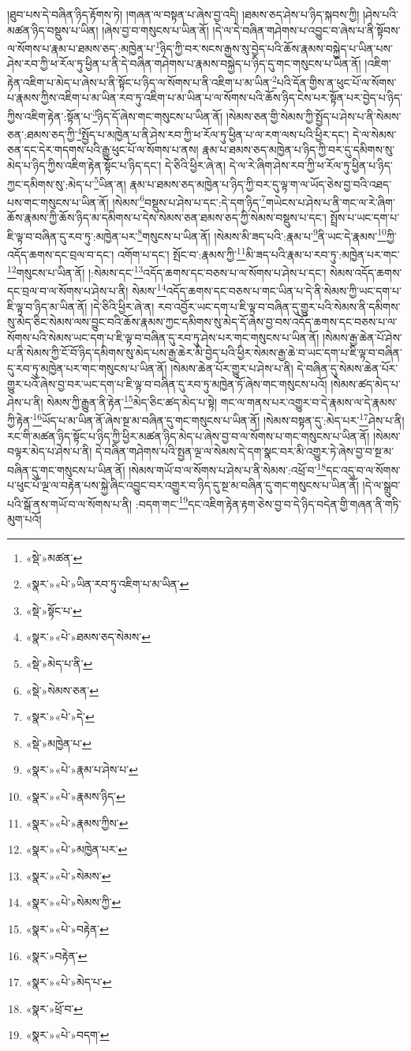 །ཐུབ་པས་དེ་བཞིན་ཉིད་རྟོགས་ཏེ། །གཞན་ལ་བསྟན་པ་ཞེས་བྱ་འདི། །ཐམས་ཅད་ཤེས་པ་ཉིད་སྐབས་ཀྱི། །ཤེས་པའི་མཚན་ཉིད་བསྡུས་པ་ཡིན། །ཞེས་བྱ་བ་གསུངས་པ་ཡིན་ནོ། །དེ་ལ་དེ་བཞིན་གཤེགས་པ་འབྱུང་བ་ཞེས་པ་ནི་སྟོབས་ལ་སོགས་པ་རྣམ་པ་ཐམས་ཅད་:མཁྱེན་པ་\footnote{«སྡེ་»མཚན་}ཉིད་ཀྱི་བར་སངས་རྒྱས་སུ་བྱེད་པའི་ཆོས་རྣམས་བསྐྱེད་པ་ཡིན་པས་ཤེས་རབ་ཀྱི་ཕ་རོལ་ཏུ་ཕྱིན་པ་ནི་དེ་བཞིན་གཤེགས་པ་རྣམས་བསྐྱེད་པ་ཉིད་དུ་གང་གསུངས་པ་ཡིན་ནོ། །འཇིག་རྟེན་འཇིག་པ་མེད་པ་ཞེས་པ་ནི་སྟོང་པ་ཉིད་ལ་སོགས་པ་ནི་འཇིག་པ་མ་ཡིན་\footnote{«སྣར་»«པེ་»ཡིན་རབ་ཏུ་འཇིག་པ་མ་ཡིན་}པའི་དོན་གྱིས་ན་ཕུང་པོ་ལ་སོགས་པ་རྣམས་ཀྱིས་འཇིག་པ་མ་ཡིན་རབ་ཏུ་འཇིག་པ་མ་ཡིན་པ་ལ་སོགས་པའི་ཆོས་ཉིད་ངེས་པར་སྟོན་པར་བྱེད་པ་ཉིད་ཀྱིས་འཇིག་རྟེན་:སྟོན་པ་\footnote{«སྡེ་»སྟོང་པ་}ཉིད་དོ་ཞེས་གང་གསུངས་པ་ཡིན་ནོ། །སེམས་ཅན་གྱི་སེམས་ཀྱི་སྤྱོད་པ་ཤེས་པ་ནི་སེམས་ཅན་:ཐམས་ཅད་ཀྱི་\footnote{«སྣར་»«པེ་»ཐམས་ཅད་སེམས་}སྤྱོད་པ་མཁྱེན་པ་ནི་ཤེས་རབ་ཀྱི་ཕ་རོལ་ཏུ་ཕྱིན་པ་ལ་རག་ལས་པའི་ཕྱིར་དང་། དེ་ལ་སེམས་ཅན་དང་དེར་གདགས་པའི་རྒྱུ་ཕུང་པོ་ལ་སོགས་པ་ནས། རྣམ་པ་ཐམས་ཅད་མཁྱེན་པ་ཉིད་ཀྱི་བར་དུ་དམིགས་སུ་མེད་པ་ཉིད་ཀྱིས་འཇིག་རྟེན་སྟོང་པ་ཉིད་དང་། དེ་ཅིའི་ཕྱིར་ཞེ་ན། དེ་ལ་རེ་ཞིག་ཤེས་རབ་ཀྱི་ཕ་རོལ་ཏུ་ཕྱིན་པ་ཉིད་ཀྱང་དམིགས་སུ་:མེད་པ་\footnote{«སྡེ་»མེད་པ་ནི་}ཡིན་ན། རྣམ་པ་ཐམས་ཅད་མཁྱེན་པ་ཉིད་ཀྱི་བར་དུ་ལྟ་ག་ལ་ཡོད་ཅེས་བྱ་བའི་འཐད་པས་གང་གསུངས་པ་ཡིན་ནོ། །སེམས་\footnote{«སྡེ་»སེམས་ཅན་}བསྡུས་པ་ཤེས་པ་དང་:དེ་དག་ཉིད་\footnote{«སྣར་»«པེ་»དེ་}གཡེངས་པ་ཤེས་པ་ནི་གང་ལ་རེ་ཞིག་ཆོས་རྣམས་ཀྱི་ཆོས་ཉིད་མ་དམིགས་པ་དེས་སེམས་ཅན་ཐམས་ཅད་ཀྱི་སེམས་བསྡུས་པ་དང་། སྤྲོས་པ་ཡང་དག་པ་ཇི་ལྟ་བ་བཞིན་དུ་རབ་ཏུ་:མཁྱེན་པར་\footnote{«སྡེ་»མཁྱེན་པ་}གསུངས་པ་ཡིན་ནོ། །སེམས་མི་ཟད་པའི་:རྣམ་པ་\footnote{«སྣར་»«པེ་»རྣམ་པ་ཤེས་པ་}ནི་ཡང་དེ་རྣམས་\footnote{«སྣར་»«པེ་»རྣམས་ཉིད་}ཀྱི་འདོད་ཆགས་དང་བྲལ་བ་དང་། འགོག་པ་དང་། སྤོང་བ་:རྣམས་ཀྱི་\footnote{«སྣར་»«པེ་»རྣམས་ཀྱིས་}མི་ཟད་པའི་རྣམ་པ་རབ་ཏུ་:མཁྱེན་པར་གང་\footnote{«སྣར་»«པེ་»མཁྱེན་པར་}གསུངས་པ་ཡིན་ནོ། །:སེམས་དང་\footnote{«སྣར་»«པེ་»སེམས་}འདོད་ཆགས་དང་བཅས་པ་ལ་སོགས་པ་ཤེས་པ་དང་། སེམས་འདོད་ཆགས་དང་བྲལ་བ་ལ་སོགས་པ་ཤེས་པ་ནི། སེམས་\footnote{«སྣར་»«པེ་»སེམས་ཀྱི་}འདོད་ཆགས་དང་བཅས་པ་གང་ཡིན་པ་དེ་ནི་སེམས་ཀྱི་ཡང་དག་པ་ཇི་ལྟ་བ་ཉིད་མ་ཡིན་ནོ། །དེ་ཅིའི་ཕྱིར་ཞེ་ན། རབ་འབྱོར་ཡང་དག་པ་ཇི་ལྟ་བ་བཞིན་དུ་གྱུར་པའི་སེམས་ནི་དམིགས་སུ་མེད་ཅིང་སེམས་ལས་བྱུང་བའི་ཆོས་རྣམས་ཀྱང་དམིགས་སུ་མེད་དོ་ཞེས་བྱ་བས་འདོད་ཆགས་དང་བཅས་པ་ལ་སོགས་པའི་སེམས་ཡང་དག་པ་ཇི་ལྟ་བ་བཞིན་དུ་རབ་ཏུ་ཤེས་པར་གང་གསུངས་པ་ཡིན་ནོ། །སེམས་རྒྱ་ཆེན་པོ་ཤེས་པ་ནི་སེམས་ཀྱི་ངོ་བོ་ཉིད་དམིགས་སུ་མེད་པས་རྒྱ་ཆེར་མི་བྱེད་པའི་ཕྱིར་སེམས་རྒྱ་ཆེ་བ་ཡང་དག་པ་ཇི་ལྟ་བ་བཞིན་དུ་རབ་ཏུ་མཁྱེན་པར་གང་གསུངས་པ་ཡིན་ནོ། །སེམས་ཆེན་པོར་གྱུར་པ་ཤེས་པ་ནི། དེ་བཞིན་དུ་སེམས་ཆེན་པོར་གྱུར་པའོ་ཞེས་བྱ་བར་ཡང་དག་པ་ཇི་ལྟ་བ་བཞིན་དུ་རབ་ཏུ་མཁྱེན་ཏོ་ཞེས་གང་གསུངས་པའོ། །སེམས་ཚད་མེད་པ་ཤེས་པ་ནི། སེམས་ཀྱི་རྒྱུན་ནི་རྟེན་\footnote{«སྣར་»«པེ་»བརྟེན་}མེད་ཅིང་ཚད་མེད་པ་སྟེ། གང་ལ་གནས་པར་འགྱུར་བ་དེ་རྣམས་ལ་དེ་རྣམས་ཀྱི་རྟེན་\footnote{«སྣར་»བརྟེན་}ཡོད་པ་མ་ཡིན་ནོ་ཞེས་སྔ་མ་བཞིན་དུ་གང་གསུངས་པ་ཡིན་ནོ། །སེམས་བསྟན་དུ་:མེད་པར་\footnote{«སྣར་»«པེ་»མེད་པ་}ཤེས་པ་ནི། རང་གི་མཚན་ཉིད་སྟོང་པ་ཉིད་ཀྱི་ཕྱིར་མཚན་ཉིད་མེད་པ་ཞེས་བྱ་བ་ལ་སོགས་པ་གང་གསུངས་པ་ཡིན་ནོ། །སེམས་བལྟར་མེད་པ་ཤེས་པ་ནི། དེ་བཞིན་གཤེགས་པའི་སྤྱན་ལྔ་ལ་སེམས་དེ་དག་སྣང་བར་མི་འགྱུར་ཏེ་ཞེས་བྱ་བ་སྔ་མ་བཞིན་དུ་གང་གསུངས་པ་ཡིན་ནོ། །སེམས་གཡོ་བ་ལ་སོགས་པ་ཤེས་པ་ནི་སེམས་:འཕྲོ་བ་\footnote{«སྣར་»ཕྲོ་བ་}དང་འདུ་བ་ལ་སོགས་པ་ཕུང་པོ་ལྔ་ལ་བརྟེན་པས་སྐྱེ་ཞིང་འབྱུང་བར་འགྱུར་བ་ཉིད་དུ་སྔ་མ་བཞིན་དུ་གང་གསུངས་པ་ཡིན་ནོ། །དེ་ལ་སྒྲུབ་པའི་སྒོ་ནས་གཡོ་བ་ལ་སོགས་པ་ནི། :བདག་གང་\footnote{«སྣར་»«པེ་»བདག་}དང་འཇིག་རྟེན་རྟག་ཅེས་བྱ་བ་དེ་ཉིད་བདེན་གྱི་གཞན་ནི་གཏི་མུག་པའོ། 